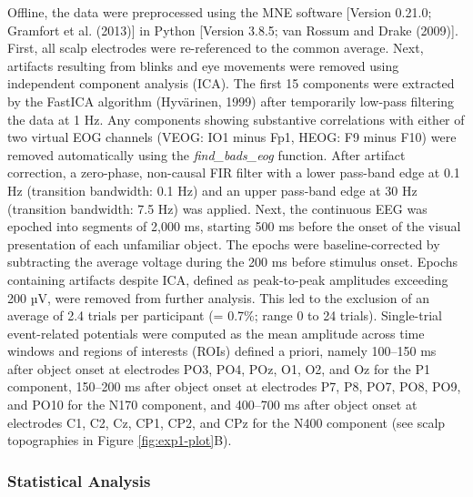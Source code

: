 \documentclass[
  english,
  doc,12pt,twoside,floatsintext]{apa7}
\begin{document}
Offline, the data were preprocessed using the MNE software {[}Version 0.21.0; Gramfort et al. (2013){]} in Python {[}Version 3.8.5; van Rossum and Drake (2009){]}. First, all scalp electrodes were re-referenced to the common average. Next, artifacts resulting from blinks and eye movements were removed using independent component analysis (ICA). The first 15 components were extracted by the FastICA algorithm (Hyvärinen, 1999) after temporarily low-pass filtering the data at 1 Hz. Any components showing substantive correlations with either of two virtual EOG channels (VEOG: IO1 minus Fp1, HEOG: F9 minus F10) were removed automatically using the \emph{find\_bads\_eog} function. After artifact correction, a zero-phase, non-causal FIR filter with a lower pass-band edge at 0.1 Hz (transition bandwidth: 0.1 Hz) and an upper pass-band edge at 30 Hz (transition bandwidth: 7.5 Hz) was applied. Next, the continuous EEG was epoched into segments of 2,000 ms, starting 500 ms before the onset of the visual presentation of each unfamiliar object. The epochs were baseline-corrected by subtracting the average voltage during the 200 ms before stimulus onset. Epochs containing artifacts despite ICA, defined as peak-to-peak amplitudes exceeding 200 µV, were removed from further analysis. This led to the exclusion of an average of 2.4 trials per participant (= 0.7\%; range 0 to 24 trials). Single-trial event-related potentials were computed as the mean amplitude across time windows and regions of interests (ROIs) defined a priori, namely 100--150 ms after object onset at electrodes PO3, PO4, POz, O1, O2, and Oz for the P1 component, 150--200 ms after object onset at electrodes P7, P8, PO7, PO8, PO9, and PO10 for the N170 component, and 400--700 ms after object onset at electrodes C1, C2, Cz, CP1, CP2, and CPz for the N400 component (see scalp topographies in Figure \ref{fig:exp1-plot}B).

\hypertarget{statistical-analysis}{%
\subsubsection{Statistical Analysis}\label{statistical-analysis}}
\end{document}
